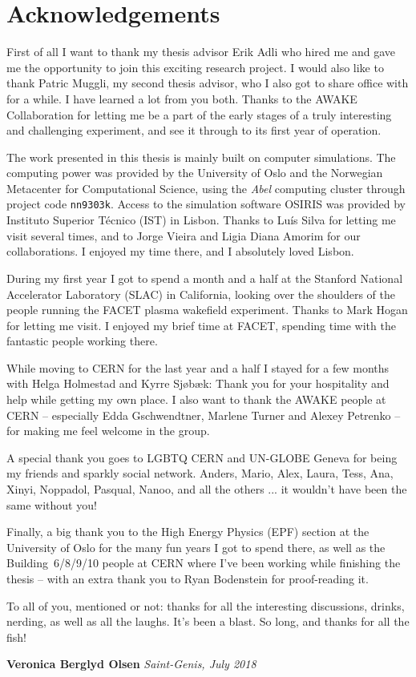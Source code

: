 \chapter*{Acknowledgements}

First of all I want to thank my thesis advisor Erik Adli who hired me and gave me the opportunity to join this exciting research project.
I would also like to thank Patric Muggli, my second thesis advisor, who I also got to share office with for a while.
I have learned a lot from you both.
Thanks to the AWAKE Collaboration for letting me be a part of the early stages of a truly interesting and challenging experiment, and see it through to its first year of operation.

The work presented in this thesis is mainly built on computer simulations.
The computing power was provided by the University of Oslo and the Norwegian Metacenter for Computational Science, using the \textit{Abel} computing cluster through project code \texttt{nn9303k}.
Access to the simulation software OSIRIS was provided by Instituto Superior Técnico (IST) in Lisbon.
Thanks to Luís Silva for letting me visit several times, and to Jorge Vieira and Ligia Diana Amorim for our collaborations.
I enjoyed my time there, and I absolutely loved Lisbon.

During my first year I got to spend a month and a half at the Stanford National Accelerator Laboratory (SLAC) in California, looking over the shoulders of the people running the FACET plasma wakefield experiment.
Thanks to Mark Hogan for letting me visit.
I enjoyed my brief time at FACET, spending time with the fantastic people working there.

While moving to CERN for the last year and a half I stayed for a few months with Helga Holmestad and Kyrre Sjøbæk:
Thank you for your hospitality and help while getting my own place.
I also want to thank the AWAKE people at CERN -- especially Edda Gschwendtner, Marlene Turner and Alexey Petrenko -- for making me feel welcome in the group.

A special thank you goes to LGBTQ CERN and UN-GLOBE Geneva for being my friends and sparkly social network.
Anders, Mario, Alex, Laura, Tess, Ana, Xinyi, Noppadol, Pasqual, Nanoo, and all the others ... it wouldn't have been the same without you!

Finally, a big thank you to the High Energy Physics (EPF) section at the University of Oslo for the many fun years I got to spend there, as well as the Building~6/8/9/10 people at CERN where I've been working while finishing the thesis -- with an extra thank you to Ryan Bodenstein for proof-reading it.

To all of you, mentioned or not: thanks for all the interesting discussions, drinks, nerding, as well as all the laughs.
It's been a blast.
So long, and thanks for all the fish!

\vfill
\null\hfill\textbf{Veronica Berglyd Olsen}
\newline
\null\hfill\textit{Saint-Genis, July 2018}
